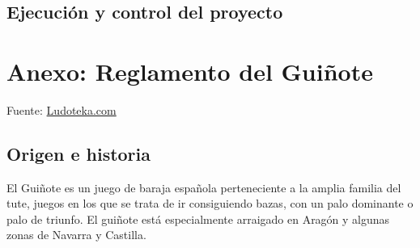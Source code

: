 \documentclass{article}
\begin{document}
\subsection{Ejecución y control del proyecto}




\appendix
\section{Anexo: Reglamento del Guiñote}
Fuente: \href{https://www.ludoteka.com/clasika/guinote.html}{Ludoteka.com}

\subsection*{Origen e historia}
El Guiñote es un juego de baraja española perteneciente a la amplia familia del tute, juegos en los que se trata de ir consiguiendo bazas, con un palo dominante o palo de triunfo. El guiñote está especialmente arraigado en Aragón y algunas zonas de Navarra y Castilla.
\end{document}
